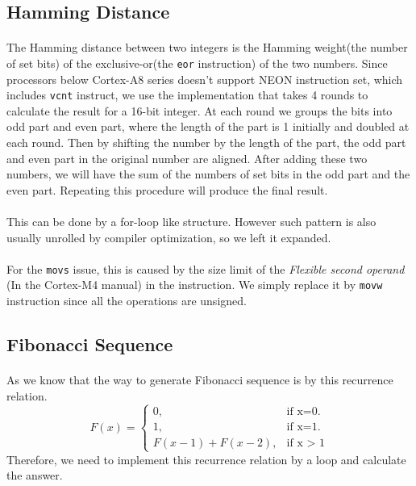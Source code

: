 \subsection{Hamming Distance}
\paragraph{}
The Hamming distance between two integers is the Hamming weight(the number of set bits)
of the exclusive-or(the \texttt{eor} instruction) of the two numbers.
Since processors below Cortex-A8 series doesn't support NEON instruction set, which includes \texttt{vcnt} instruct, we use the implementation
that takes 4 rounds to calculate the result for a 16-bit integer. At each round we groups the bits into odd part and even part,
where the length of the part is 1 initially and doubled at each round.
Then by shifting the number by the length of the part, the odd part and even part in the original number are aligned. 
After adding these two numbers, we will have the sum of the numbers of set bits in the odd part and the even part.
Repeating this procedure will produce the final result.
\paragraph{}
This can be done by a for-loop like structure. However such pattern is also usually unrolled by compiler optimization,
so we left it expanded.
\paragraph{}
For the \texttt{movs} issue, this is caused by the size limit of the \textit{Flexible second operand}
(In the Cortex-M4 manual) in the instruction.
We simply replace it by \texttt{movw} instruction since all the operations are unsigned.
\subsection{Fibonacci Sequence}
\paragraph{}
As we know that the way to generate Fibonacci sequence is by this recurrence relation.
\begin{equation}
  F(x)=\begin{cases}
    0, & \text{if x=0}.\\
    1, & \text{if x=1}.\\
    F(x - 1) + F(x - 2), & \text{if x > 1}
  \end{cases}
\end{equation}
Therefore, we need to implement this recurrence relation by a loop and calculate the answer.
